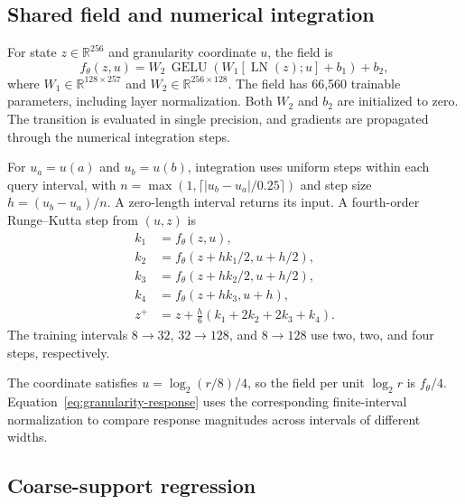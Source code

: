 \subsection{Shared field and numerical integration}

For state $z\in\mathbb R^{256}$ and granularity coordinate $u$, the field is
\begin{equation}
f_\theta(z,u)
=W_2\,\operatorname{GELU}\!\left(
W_1[\operatorname{LN}(z);u]+b_1\right)+b_2,
\label{eq:ode-field-network}
\end{equation}
where $W_1\in\mathbb R^{128\times 257}$ and $W_2\in\mathbb R^{256\times 128}$. The field has 66,560 trainable parameters, including layer normalization. Both $W_2$ and $b_2$ are initialized to zero. The transition is evaluated in single precision, and gradients are propagated through the numerical integration steps.

For $u_a=u(a)$ and $u_b=u(b)$, integration uses uniform steps within each query interval, with $n=\max(1,\lceil |u_b-u_a|/0.25\rceil)$ and step size $h=(u_b-u_a)/n$. A zero-length interval returns its input. A fourth-order Runge--Kutta step from $(u,z)$ is
\begin{equation}
\begin{aligned}
k_1&=f_\theta(z,u),\\
k_2&=f_\theta(z+hk_1/2,u+h/2),\\
k_3&=f_\theta(z+hk_2/2,u+h/2),\\
k_4&=f_\theta(z+hk_3,u+h),\\
z^{+}&=z+\frac h 6(k_1+2 k_2+2 k_3+k_4).
\end{aligned}
\label{eq:rk4-transition}
\end{equation}
The training intervals $8\to 32$, $32\to 128$, and $8\to 128$ use two, two, and four steps, respectively.

The coordinate satisfies $u=\log_2(r/8)/4$, so the field per unit $\log_2 r$ is $f_\theta/4$. Equation~\ref{eq:granularity-response} uses the corresponding finite-interval normalization to compare response magnitudes across intervals of different widths.

\subsection{Coarse-support regression}

